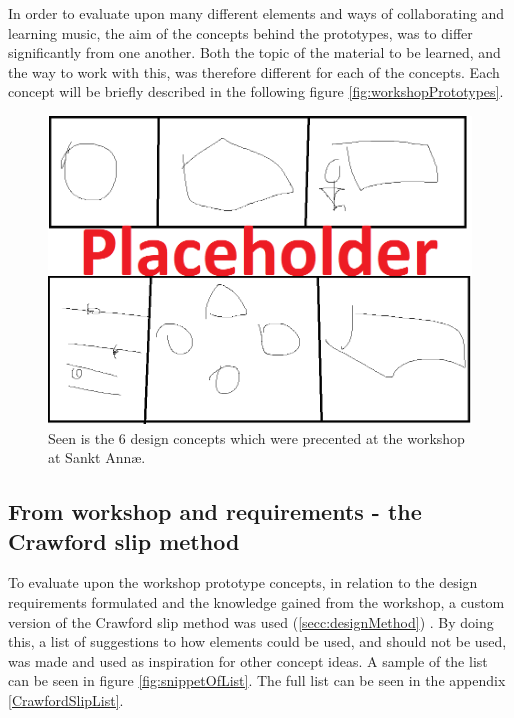 In order to evaluate upon many different elements and ways of collaborating and learning music, the aim of the concepts behind the prototypes, was to differ significantly from one another. Both the topic of the material to be learned, and the way to work with this, was therefore different for each of the concepts. Each concept will be briefly described in the following figure \autoref{fig:workshopPrototypes}.

\begin{figure}[H]
	\centering
	\includegraphics[width=0.9\linewidth]{figure/Design/workshopPrototypes} 
	\caption{Seen is the 6 design concepts which were precented at the workshop at Sankt Annæ.}
	\label{fig:workshopPrototypes}
\end{figure}


\subsection{From workshop and requirements - the Crawford slip method}
To evaluate upon the workshop prototype concepts, in relation to the design requirements formulated and the knowledge gained from the workshop, a custom version of the Crawford slip method was used (\autoref{secc:designMethod}) . By doing this, a list of suggestions to how elements could be used, and should not be used, was made and used as inspiration for other concept ideas. A sample of the list can be seen in figure \autoref{fig:snippetOfList}. The full list can be seen in the appendix \autoref{CrawfordSlipList}.  

